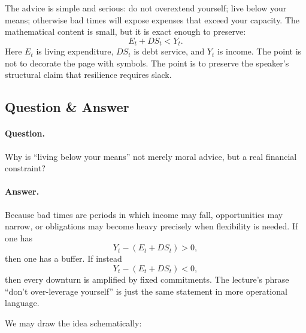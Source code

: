 The advice is simple and serious: do not overextend yourself; live below your means; otherwise bad times will expose expenses that exceed your capacity. The mathematical content is small, but it is exact enough to preserve:
\begin{equation}
E_t + DS_t < Y_t.
\end{equation}
Here \(E_t\) is living expenditure, \(DS_t\) is debt service, and \(Y_t\) is income. The point is not to decorate the page with symbols. The point is to preserve the speaker's structural claim that resilience requires slack.

\subsection{Question \& Answer}

\paragraph{Question.} Why is ``living below your means'' not merely moral advice, but a real financial constraint?

\paragraph{Answer.} Because bad times are periods in which income may fall, opportunities may narrow, or obligations may become heavy precisely when flexibility is needed. If one has
\begin{equation}
Y_t - (E_t + DS_t) > 0,
\end{equation}
then one has a buffer. If instead
\begin{equation}
Y_t - (E_t + DS_t) < 0,
\end{equation}
then every downturn is amplified by fixed commitments. The lecture's phrase ``don't over-leverage yourself'' is just the same statement in more operational language.

We may draw the idea schematically:

\begin{figure}
\centering
{}
\end{figure}

